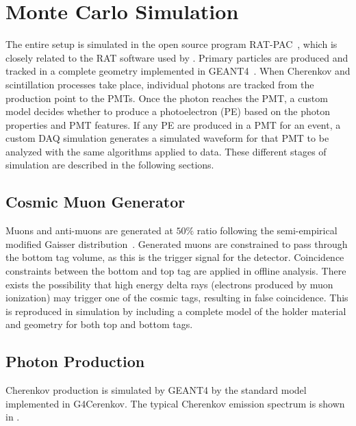 \section{Monte Carlo Simulation}
\label{sec:simulation}

The entire setup is simulated in the open source program RAT-PAC~\cite{ratpac}, which is closely related to the RAT software used by {\snop}. 
Primary particles are produced and tracked in a complete geometry implemented in GEANT4~\cite{geant4}. 
When Cherenkov and scintillation processes take place, individual photons are tracked from the production point to the PMTs. 
Once the photon reaches the PMT, a custom model decides whether to produce a photoelectron (PE) based on the photon properties and PMT features. 
If any PE are produced in a PMT for an event, a custom DAQ simulation generates a simulated waveform for that PMT to be analyzed with the same algorithms applied to data.
These different stages of simulation are described in the following sections.

\subsection{Cosmic Muon Generator}
\label{sec:primarygen}

Muons and anti-muons are generated at $50\%$ ratio following the semi-empirical modified Gaisser distribution~\cite{gaisser-mod}. 
Generated muons are constrained to pass through the bottom tag volume, as this is the trigger signal for the detector. 
Coincidence constraints between the bottom and top tag are applied in offline analysis.
There exists the possibility that high energy delta rays (electrons produced by muon ionization) may trigger one of the cosmic tags, resulting in false coincidence.
This is reproduced in simulation by including a complete model of the holder material and geometry for both top and bottom tags.

\subsection{Photon Production \label{sec:photon_prod}}

Cherenkov production is simulated by GEANT4 by the standard model implemented in G4Cerenkov. 
The typical Cherenkov emission spectrum is shown in .

